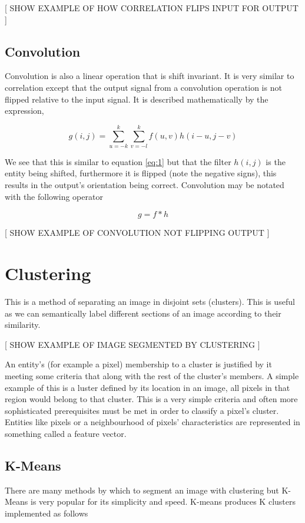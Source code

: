[ SHOW EXAMPLE OF HOW CORRELATION FLIPS INPUT FOR OUTPUT ]

\subsection{Convolution}

Convolution is also a linear operation that is shift invariant. It is very similar to correlation except that the output signal from a convolution operation is not flipped relative to the input signal. It is described mathematically by the expression,

\[ g(i,j) = \sum_{u=-k}^{k}\sum_{v = -l}^{k}f(u,v)h(i-u,j-v)\]

We see that this is similar to equation \ref{eq:1} but that the filter $h(i,j)$ is the entity being shifted, furthermore it is flipped (note the negative signs), this results in the output's orientation being correct. Convolution may be notated with the following operator

\[g = f \ast h\]

[ SHOW EXAMPLE OF CONVOLUTION NOT FLIPPING OUTPUT ]


\section{Clustering}
This is a method of separating an image in disjoint sets (clusters). This is useful as we can semantically label different sections of an image according to their similarity.

[ SHOW EXAMPLE OF IMAGE SEGMENTED BY CLUSTERING ]

An entity’s  (for example a pixel) membership to a cluster is justified by it meeting some criteria that along with the rest of the cluster’s members. A simple example of this is a luster defined by its location in an image, all pixels in that region would belong to that cluster. This is a very simple criteria and often more sophisticated prerequisites must be met in order to classify a pixel's cluster. Entities like pixels or a neighbourhood of pixels' characteristics are represented in something called a feature vector.


\subsection{K-Means}
There are many methods by which to segment an image with clustering but K-Means is very popular for its simplicity and speed. K-means produces K clusters implemented as follows

